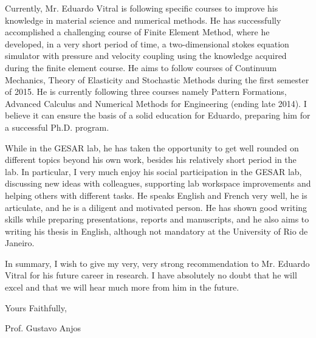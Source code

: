 \documentclass[12pt,a4paper]{article}
\begin{document}
Currently, Mr. Eduardo Vitral is following specific courses to improve
his knowledge in material science and numerical methods. He has
successfully accomplished a challenging course of Finite Element Method,
where he developed, in a very short period of time, a two-dimensional
stokes equation simulator with pressure and velocity coupling using the
knowledge acquired during the finite element course. He aims to follow
courses of Continuum Mechanics, Theory of Elasticity and Stochastic
Methods during the first semester of 2015. He is currently following
three courses namely Pattern Formations, Advanced Calculus and Numerical
Methods for Engineering (ending late 2014). I believe it can ensure
the basis of a solid education for Eduardo, preparing him for a
successful Ph.D. program. 

While in the GESAR lab, he has taken the opportunity to get well rounded
on different topics beyond his own work, besides his relatively short
period in the lab. In particular, I very much enjoy his social
participation in the GESAR lab, discussing new ideas with colleagues,
supporting lab workspace improvements and helping others with different
tasks. He speaks English and French very well, he is articulate, and he
is a diligent and motivated person. He has shown good writing skills
while preparing presentations, reports and manuscripts, and he also
aims to writing his thesis in English, although not mandatory at the
University of Rio de Janeiro.

In summary, I wish to give my very, very strong recommendation to Mr.
Eduardo Vitral for his future career in research. I have absolutely no
doubt that he will excel and that we will hear much more from him in the
future.

Yours Faithfully,

\vspace{2cm}

\begin{center}
Prof. Gustavo Anjos
\end{center}
\end{document}
